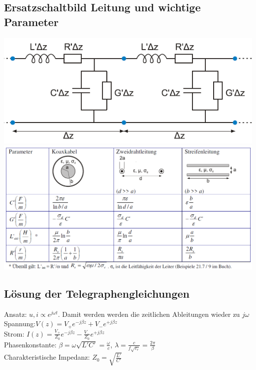 \documentclass[english]{latex4ei/latex4ei_sheet}
\begin{document}
\begin{sectionbox}
    \subsection{Ersatzschaltbild Leitung und wichtige Parameter}
    \includegraphics[width = \columnwidth]{./img/ersatzschaltbild_leitung.png}\\
    \includegraphics[width = \columnwidth]{./img/parameter_leitungen.png}\\
\end{sectionbox}
\begin{sectionbox}
    \subsection{Lösung der Telegraphengleichungen}
    Ansatz: $u,i \propto e^{j\omega t}$. Damit werden werden die zeitlichen Ableitungen wieder zu $j\omega$\\

    Spannung:\qquad $V(z) = V_+ e^{-j\beta z} + V_- e^{+j\beta z}$\\
    Strom:	\qquad$I(z) = \frac{V_+}{Z_0} e^{-j\beta z} - \frac{V_-}{Z_0} e^{+j\beta z}$\\
    Phasenkonstante: $\beta = \omega\sqrt{L' C'} = \frac{\omega}{c}$, $\lambda = \frac{c}{f\sqrt{\varepsilon_r}} = \frac{2\pi}{\beta}$\\
    Charakteristische Impedanz: $Z_0 = \sqrt{\frac{L'}{C'}}$

\end{sectionbox}
\end{document}
